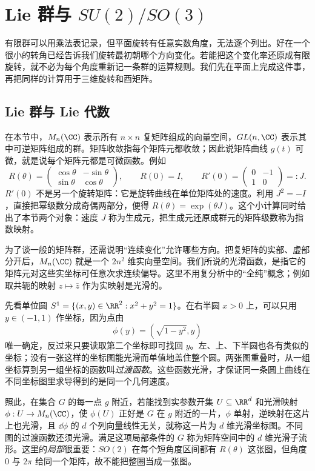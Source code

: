\chapter{\texorpdfstring{Lie 群与 $SU(2)/SO(3)$}{Lie 群与 SU(2)/SO(3)}}
\label{chap:lie-groups-algebras}

有限群可以用乘法表记录，但平面旋转有任意实数角度，无法逐个列出。好在一个很小的转角已经告诉我们旋转最初朝哪个方向变化。若能把这个变化率还原成有限旋转，就不必为每个角度重新记一条群的运算规则。我们先在平面上完成这件事，再把同样的计算用于三维旋转和酉矩阵。

\section{Lie 群与 Lie 代数}

在本节中，$M_n(\CC)$ 表示所有 $n\times n$ 复矩阵组成的向量空间，$GL(n,\CC)$ 表示其中可逆矩阵组成的群。矩阵收敛指每个矩阵元都收敛；因此说矩阵曲线 $g(t)$ 可微，就是说每个矩阵元都是可微函数。例如
\[
R(\theta)=\begin{pmatrix}
\cos\theta&-\sin\theta\\ \sin\theta&\cos\theta
\end{pmatrix},\qquad
R(0)=I,\qquad
R'(0)=\begin{pmatrix}0&-1\\1&0\end{pmatrix}=:J.
\]
$R'(0)$ 不是另一个旋转矩阵：它是旋转曲线在单位矩阵处的速度。利用 $J^2=-I$，直接把幂级数分成奇偶两部分，便得 $R(\theta)=\exp(\theta J)$。这个小计算同时给出了本节两个对象：速度 $J$ 称为生成元，把生成元还原成群元的矩阵级数称为指数映射。

为了谈一般的矩阵群，还需说明“连续变化”允许哪些方向。把复矩阵的实部、虚部分开后，$M_n(\CC)$ 就是一个 $2n^2$ 维实向量空间。我们所说的光滑函数，是指它的矩阵元对这些实坐标可任意次求连续偏导。这里不用复分析中的“全纯”概念；例如取共轭的映射 $z\mapsto\bar z$ 作为实映射是光滑的。

先看单位圆 $S^1=\{(x,y)\in\RR^2:x^2+y^2=1\}$。在右半圆 $x>0$ 上，可以只用 $y\in(-1,1)$ 作坐标，因为点由
\[
\phi(y)=(\sqrt{1-y^2},y)
\]
唯一确定，反过来只要读取第二个坐标即可找回 $y$。左、上、下半圆也各有类似的坐标；没有一张这样的坐标图能光滑而单值地盖住整个圆。两张图重叠时，从一组坐标算到另一组坐标的函数叫\emph{过渡函数}。这些函数光滑，才保证同一条圆上曲线在不同坐标图里求导得到的是同一个几何速度。

照此，在集合 $G$ 的每一点 $g$ 附近，若能找到实参数开集 $U\subseteq\RR^d$ 和光滑映射 $\phi:U\to M_n(\CC)$，使 $\phi(U)$ 正好是 $G$ 在 $g$ 附近的一片，$\phi$ 单射，逆映射在这片上也光滑，且 $\dd\phi$ 的 $d$ 个列向量线性无关，就称这一片为 $d$ 维光滑坐标图。不同图的过渡函数还须光滑。满足这项局部条件的 $G$ 称为矩阵空间中的 $d$ 维光滑子流形。这里的\emph{局部}很重要：$SO(2)$ 在每个短角度区间都有 $R(\theta)$ 这张图，但角度 $0$ 与 $2\pi$ 给同一个矩阵，故不能把整圈当成一张图。

